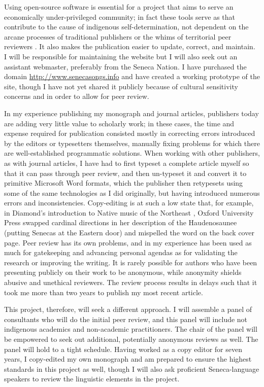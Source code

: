 \documentclass{neh}
\begin{document}
Using open-source software is essential for a project that aims to serve an
economically under-privileged community; in fact these tools serve as
 that contribute to the cause of indigenous
self-determination, not dependent on the arcane processes of traditional
publishers or the whims of territorial peer reviewers
\autocite[\XXX]{BasicCall}.
It also makes the publication easier to update, correct, and maintain.
I will be responsible for maintaining the website but I will also seek out an
assistant webmaster, preferably from the Seneca Nation.
I have purchased the domain \url{http://www.senecasongs.info} and have created
a working prototype of the site, though I have not yet shared it publicly
because of cultural sensitivity concerns and in order to allow for peer
review.

In my experience publishing my monograph and journal articles, publishers
today are adding very little value to scholarly work; in these cases, the time
and expense required for publication consisted mostly in correcting errors
introduced by the editors or typesetters themselves, manually fixing problems
for which there are well-established programmatic solutions.
When working with other publishers, as with journal articles, I have had to
first typeset a complete article  myself so that it can pass through peer
review, and then un-typeset it and convert it to primitive Microsoft Word
formats, which the publisher then retypesets using some of the same
technologies as I did originally, but having introduced numerous errors and
inconsistencies.
Copy-editing is at such a low state that, for example, in Diamond's
introduction to Native music of the Northeast
\autocite{Diamond:NativeAmericanNortheast}, 
Oxford University Press swapped cardinal directions in her description of the
Haudenosaunee (putting Senecas at the Eastern door) and mispelled the word
 on the back cover page.
Peer review has its own problems, and in my experience has been used as much
for gatekeeping and advancing personal agendas as for validating the research
or improving the writing.
It is rarely possible for authors who have been presenting publicly on their
work to be anonymous, while anonymity shields abusive and unethical reviewers.
The review process results in delays such that it took me more than two years
to publish my most recent article.

This project, therefore, will seek a different approach. 
I will assemble a panel of consultants who will do the initial peer review,
and this panel will include not indigenous academics and non-academic
practitioners.
The chair of the panel will be empowered to seek out additional, potentially
anonymous reviews as well.
The panel will hold to a tight schedule.
Having worked as a copy editor for seven years, I copy-edited my own monograph
and am prepared to ensure the highest standards in this project as well,
though I will also ask proficient Seneca-language speakers to review the
linguistic elements in the project.
\end{document}
